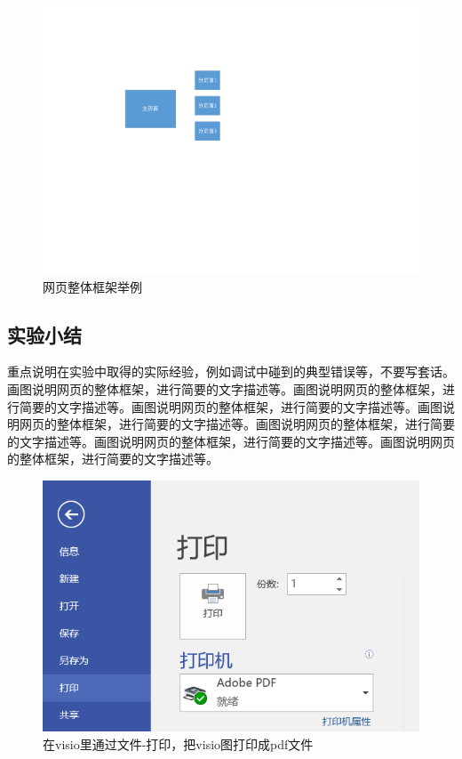 \documentclass[supercite]{Experimental_Report}
\theoremstyle{definition}
\begin{document}
\begin{figure}[htb] %
	\begin{center}
		\includegraphics[scale=0.80]{images/1-1.pdf}
		\caption{网页整体框架举例}
		\label{fig1-1}
	\end{center}
\end{figure}

\subsection{实验小结}

重点说明在实验中取得的实际经验，例如调试中碰到的典型错误等，不要写套话。画图说明网页的整体框架，进行简要的文字描述等。画图说明网页的整体框架，进行简要的文字描述等。画图说明网页的整体框架，进行简要的文字描述等。画图说明网页的整体框架，进行简要的文字描述等。画图说明网页的整体框架，进行简要的文字描述等。画图说明网页的整体框架，进行简要的文字描述等。画图说明网页的整体框架，进行简要的文字描述等。

\begin{figure}[htb]
	\begin{center}
		\includegraphics[scale=0.60]{images/1-2.png}
		\caption{在visio里通过文件-打印，把visio图打印成pdf文件}
		\label{fig1-2}
	\end{center}
\end{figure}
\end{document}
